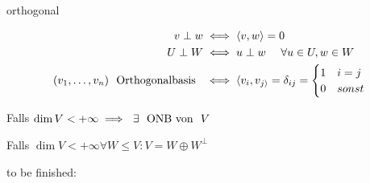 \documentclass[class=article, crop=false]{standalone}
\begin{document}
\begin{zettel}{orthogonal}
\begin{flashcard}
    \begin{definition}
    \begin{align*}
        v \perp w &\iff  \langle v,w\rangle =0\\
        U \perp W &\iff  u \perp w \quad \forall u \in  U, w \in  W\\
        (v_1,\dots,v_n)  \tx{ Orthogonalbasis } &\iff  \langle v_i,v_{j\rangle}= \delta_{i j} = \begin{cases}
            1 & i=j\\
            0 & sonst
        \end{cases}
    \end{align*}
    \end{definition}
\end{flashcard}

\begin{corollary}
Falls $\dim V < + \infty \implies \exists \tx{ ONB von } V$
\end{corollary}

\begin{corollary}
Falls $\dim V < + \infty \forall W \leq V : V = W \oplus W^{\perp}$
\end{corollary}


to be finished:

\end{zettel}
\end{document}
